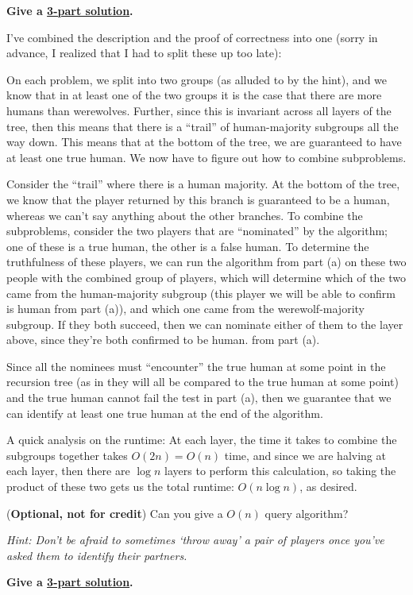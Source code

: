 \documentclass[11pt]{article}
\begin{document}
\begin{subparts}
	\textbf{Give a \href{https://cs170.org/resources/homework-guidelines/}{3-part solution}.}

	\begin{solution}
		I've combined the description and the proof of correctness into one (sorry in advance, I realized 
		that I had to split these up too late): 

		On each problem, we split into two groups (as alluded to by the hint), and we know that in at least 
		one of the two groups it is the case that there are more humans than werewolves. Further, 
		since this is invariant across all layers of the tree, then this means that there is a ``trail'' 
		of human-majority subgroups all the way down. This means that at the bottom of the tree, we are 
		guaranteed to have at least one true human. We now have to figure out how to combine subproblems.

		Consider the ``trail'' where there is a human majority. At the bottom of the tree, we know that 
		the player returned by this branch is guaranteed to be a human, whereas we can't say anything about 
		the other branches. To combine the subproblems, consider the two players that are ``nominated'' by 
		the algorithm; one of these is a true human, the other is a false human. To determine the truthfulness
		of these players, we can run the algorithm from part (a)
		on these two people with the combined group of players, which will determine which of the two 
		came from the human-majority subgroup (this player we will be able to confirm is human from part (a)), 
		and which one came from the werewolf-majority subgroup. If they both 
		succeed, then we can nominate either of them to the layer above, since they're both confirmed to be human. 
		from part (a).

		Since all the nominees must ``encounter'' the true human at some point in the recursion tree (as in 
		they will all be compared to the true human at some point) and the true human cannot fail the test
		in part (a), then we guarantee that we can identify at least one true human at the end of the algorithm.


		A quick analysis on the runtime: At each layer, the time it takes to combine the subgroups 
		together takes $O(2n) = O(n)$ time, and since we are halving at each layer, then there are $\log n$ 
		layers to perform this calculation, so taking the product of these two gets us the 
		total runtime: $O(n \log n)$, as desired.
	\end{solution}

	\subpart (\textbf{Optional, not for credit}) Can you give a $O(n)$ query algorithm?
	
	\textit{Hint: Don't be afraid to sometimes `throw away' a pair of players once you've asked them to identify their partners.}

	\textbf{Give a \href{https://cs170.org/resources/homework-guidelines/}{3-part solution}.}

\end{subparts}
\end{document}
